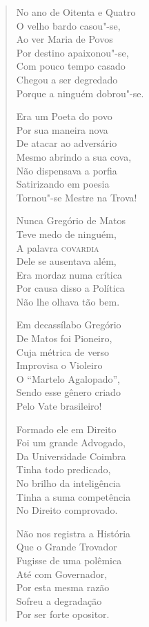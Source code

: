 \begin{verse}
No ano de Oitenta e Quatro \\
O velho bardo casou"-se, \\
Ao ver Maria de Povos \\
Por destino apaixonou"-se, \\
Com pouco tempo casado \\
Chegou a ser degredado \\
Porque a ninguém dobrou"-se. 


Era um Poeta do povo \\
Por sua maneira nova \\
De atacar ao adversário \\
Mesmo abrindo a sua cova, \\
Não dispensava a porfia \\
Satirizando em poesia \\
Tornou"-se Mestre na Trova! 

Nunca Gregório de Matos \\
Teve medo de ninguém, \\
A palavra \textsc{covardia} \\
Dele se ausentava além, \\
Era mordaz numa crítica \\
Por causa disso a Política \\
Não lhe olhava tão bem. 

Em decassílabo Gregório \\
De Matos foi Pioneiro, \\
Cuja métrica de verso \\
Improvisa o Violeiro \\
O ``Martelo Agalopado'', \\
Sendo esse gênero criado \\
Pelo Vate brasileiro! 

Formado ele em Direito \\
Foi um grande Advogado, \\
Da Universidade Coimbra \\
Tinha todo predicado, \\
No brilho da inteligência \\
Tinha a suma competência \\
No Direito comprovado.


Não nos registra a História \\
Que o Grande Trovador \\
Fugisse de uma polêmica \\
Até com Governador, \\
Por esta mesma razão \\
Sofreu a degradação \\
Por ser forte opositor. 


\end{verse}
